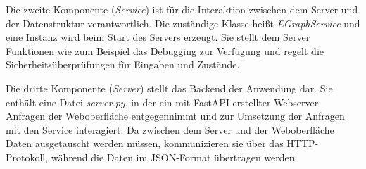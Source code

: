 




Die zweite Komponente (\textit{Service}) ist für die Interaktion zwischen dem Server und der Datenstruktur verantwortlich. Die zuständige Klasse heißt \textit{EGraphService} und 
eine Instanz wird beim Start des Servers erzeugt.
Sie stellt dem Server Funktionen wie zum Beispiel das Debugging zur Verfügung und regelt die Sicherheitsüberprüfungen für Eingaben und Zustände. 



Die dritte Komponente (\textit{Server}) stellt das Backend der Anwendung dar. Sie enthält eine Datei \textit{server.py}, in der ein mit FastAPI erstellter Webserver
Anfragen der Weboberfläche entgegennimmt und zur Umsetzung der Anfragen mit den Service interagiert. Da zwischen dem Server und der Weboberfläche Daten ausgetauscht werden
müssen, kommunizieren sie über das HTTP-Protokoll, während die Daten im JSON-Format übertragen werden.

